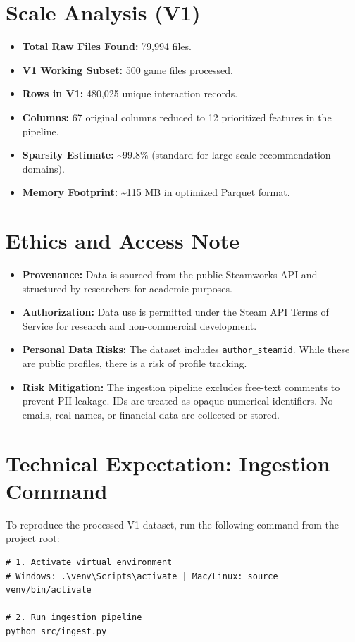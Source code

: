 \documentclass[11pt,a4paper]{article}
\begin{document}
\section{Scale Analysis (V1)}
\begin{itemize}[leftmargin=*]
  \item \textbf{Total Raw Files Found:} 79,994 files.
  \item \textbf{V1 Working Subset:} 500 game files processed.
  \item \textbf{Rows in V1:} 480,025 unique interaction records.
  \item \textbf{Columns:} 67 original columns reduced to 12 prioritized features in the pipeline.
  \item \textbf{Sparsity Estimate:} \textasciitilde 99.8\% (standard for large-scale recommendation domains).
  \item \textbf{Memory Footprint:} \textasciitilde 115 MB in optimized Parquet format.
\end{itemize}

\section{Ethics and Access Note}
\begin{itemize}[leftmargin=*]
  \item \textbf{Provenance:} Data is sourced from the public Steamworks API and structured by researchers for academic purposes.
  \item \textbf{Authorization:} Data use is permitted under the Steam API Terms of Service for research and non-commercial development.
  \item \textbf{Personal Data Risks:} The dataset includes \texttt{author\_steamid}. While these are public profiles, there is a risk of profile tracking.
  \item \textbf{Risk Mitigation:} The ingestion pipeline excludes free-text comments to prevent PII leakage. IDs are treated as opaque numerical identifiers. No emails, real names, or financial data are collected or stored.
\end{itemize}

\section{Technical Expectation: Ingestion Command}
To reproduce the processed V1 dataset, run the following command from the project root:

\begin{verbatim}
# 1. Activate virtual environment
# Windows: .\venv\Scripts\activate | Mac/Linux: source venv/bin/activate

# 2. Run ingestion pipeline
python src/ingest.py
\end{verbatim}
\end{document}
